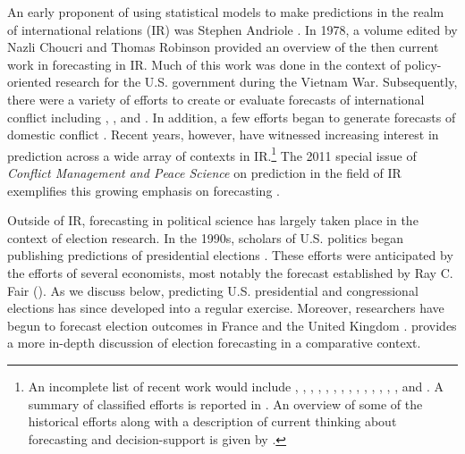 \documentclass[pdftex,12pt,fullpage,oneside]{amsart}
\begin{document}
An early proponent of using statistical models to make predictions in
the realm of international relations (IR) was Stephen Andriole
\citep{Andriole:Young:1977}. In 1978, a volume edited by Nazli Choucri
and Thomas Robinson \nocite{Choucri:Robinson:1978} provided an
overview of the then current work in forecasting in IR.  Much of this
work was done in the context of policy-oriented research for the
U.S. government during the Vietnam War.  Subsequently, there were a
variety of efforts to create or evaluate forecasts of international
conflict including \citet{Freeman:Job:1979},
\citet{Singer:Wallace:1979}, and \citet{Vincent:1980}. In
addition, a few efforts began to generate forecasts of domestic
conflict \citep[e.g.,][]{Gurr:Lichbach:1986}.  Recent years,
however, have witnessed increasing interest in prediction across a
wide array of contexts in IR.\footnote{An incomplete list of recent
  work would include \citet{Krause:1997}, \citet{Davies:Gurr:1998},
  \citet{Pevehouse:Goldstein:1999}, \citet{Schrodt:Gerner:2000},
  \citet{King:Zeng:2001}, \citet{OBrien:2002}, \citet{BDM:2002},
  \citet{Fearon:Laitin:2003}, \citet{Demarchi:etal:2004}, \citet{Enders:Sandler:2005},
  \citet{Leblang:Satyanath:2006}, \citet{Ward:etal:2007},
  \citet{Brandt:etal:2008}, \citet{Bennett:Stam:2009}, and
  \citet{Gleditsch:Ward:2010}. A summary of classified efforts is
  reported in \citet{Feder:2002}.  An overview of some of the
  historical efforts along with a description of current thinking
  about forecasting and decision-support is given by
  \citet{OBrien:2010}.}  The 2011 special issue of \emph{Conflict
  Management and Peace Science} on prediction in the field of IR
exemplifies this growing emphasis on forecasting
\citep[c.f.,][]{Schneider_etal_2011, Mesquita_2011,
  Brandt_etal_2011}.
  
Outside of IR, forecasting in political science has largely taken
place in the context of election research.  In the 1990s, scholars of
U.S. politics began publishing predictions of presidential elections
\citep{Campbell:1990, Campbell:1992}. These efforts were anticipated
by the efforts of several economists, most notably the forecast
established by Ray C. Fair (\citeyear{Fair:1978}). As we discuss
below, predicting U.S. presidential and congressional elections has
since developed into a regular exercise.  Moreover, researchers have begun to forecast election outcomes in France
\citep[e.g.,][]{Jerome:1999} and the United Kingdom
\citep[e.g.,][]{Whitely:2005}. \citet{Lewis-Beck:2005}
  provides a more in-depth discussion of election forecasting in a
  comparative context.
\end{document}
